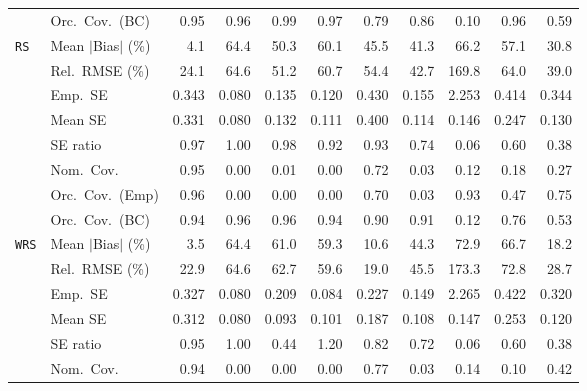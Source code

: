 \begin{landscape}
\begin{longtable}{llrrrrrrrrr}
 & Orc.\ Cov.\ (BC) & \cellcolor{rankone}0.95 & \cellcolor{ranktwo}0.96 & 0.99 & \cellcolor{rankthree}0.97 & 0.79 & 0.86 & 0.10 & \cellcolor{ranktwo}0.96 & 0.59 \\
\addlinespace[2pt]
\quad \texttt{RS} & Mean $|$Bias$|$ (\%) & \cellcolor{rankone}4.1 & 64.4 & 50.3 & 60.1 & 45.5 & \cellcolor{rankthree}41.3 & 66.2 & 57.1 & \cellcolor{ranktwo}30.8 \\
 & Rel.\ RMSE (\%) & \cellcolor{rankone}24.1 & 64.6 & 51.2 & 60.7 & 54.4 & \cellcolor{rankthree}42.7 & 169.8 & 64.0 & \cellcolor{ranktwo}39.0 \\
 & Emp.\ SE & 0.343 & 0.080 & 0.135 & 0.120 & 0.430 & 0.155 & 2.253 & 0.414 & 0.344 \\
 & Mean SE & 0.331 & 0.080 & 0.132 & 0.111 & 0.400 & 0.114 & 0.146 & 0.247 & 0.130 \\
 & SE ratio & \cellcolor{rankthree}0.97 & \cellcolor{rankone}1.00 & \cellcolor{ranktwo}0.98 & 0.92 & 0.93 & 0.74 & 0.06 & 0.60 & 0.38 \\
 & Nom.\ Cov. & \cellcolor{rankone}0.95 & 0.00 & 0.01 & 0.00 & \cellcolor{ranktwo}0.72 & 0.03 & 0.12 & 0.18 & \cellcolor{rankthree}0.27 \\
 & Orc.\ Cov.\ (Emp) & \cellcolor{rankone}0.96 & 0.00 & 0.00 & 0.00 & 0.70 & 0.03 & \cellcolor{ranktwo}0.93 & 0.47 & \cellcolor{rankthree}0.75 \\
 & Orc.\ Cov.\ (BC) & \cellcolor{rankone}0.94 & \cellcolor{rankone}0.96 & \cellcolor{rankone}0.96 & \cellcolor{rankone}0.94 & \cellcolor{rankthree}0.90 & \cellcolor{ranktwo}0.91 & 0.12 & 0.76 & 0.53 \\
\addlinespace[2pt]
\quad \texttt{WRS} & Mean $|$Bias$|$ (\%) & \cellcolor{rankone}3.5 & 64.4 & 61.0 & 59.3 & \cellcolor{ranktwo}10.6 & 44.3 & 72.9 & 66.7 & \cellcolor{rankthree}18.2 \\
 & Rel.\ RMSE (\%) & \cellcolor{ranktwo}22.9 & 64.6 & 62.7 & 59.6 & \cellcolor{rankone}19.0 & 45.5 & 173.3 & 72.8 & \cellcolor{rankthree}28.7 \\
 & Emp.\ SE & 0.327 & 0.080 & 0.209 & 0.084 & 0.227 & 0.149 & 2.265 & 0.422 & 0.320 \\
 & Mean SE & 0.312 & 0.080 & 0.093 & 0.101 & 0.187 & 0.108 & 0.147 & 0.253 & 0.120 \\
 & SE ratio & \cellcolor{ranktwo}0.95 & \cellcolor{rankone}1.00 & 0.44 & 1.20 & \cellcolor{rankthree}0.82 & 0.72 & 0.06 & 0.60 & 0.38 \\
 & Nom.\ Cov. & \cellcolor{rankone}0.94 & 0.00 & 0.00 & 0.00 & \cellcolor{ranktwo}0.77 & 0.03 & 0.14 & 0.10 & \cellcolor{rankthree}0.42 \\

\end{longtable}
\end{landscape}
